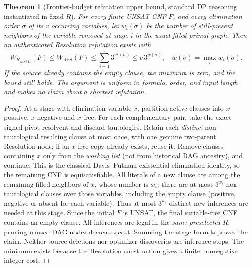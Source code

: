 \documentclass[11pt]{article}
\newtheorem{theorem}{Theorem}
\begin{document}
\begin{theorem}[Frontier-budget refutation upper bound, standard DP reasoning instantiated in fixed $R$]
For every finite UNSAT CNF $F$, and \emph{every} elimination order $\sigma$ of its $v$ occurring variables, let $w_i(\sigma)$ be the number of still-present neighbors of the variable removed at stage $i$ in the usual \emph{filled} primal graph. Then an authenticated Resolution refutation exists with
\[
\boxed{W_{R_{\mathrm{mix341}}}(F)\le W_{\mathrm{RES}}(F)\le
       \sum_{i=1}^{v}3^{w_i(\sigma)}
       \le v\,3^{w(\sigma)},\quad
       w(\sigma)=\max_i w_i(\sigma).}
\]
If the source already contains the empty clause, the minimum is zero, and the bound still holds. The argument is uniform in formula, order, and input length and makes no claim about a shortest refutation.
\end{theorem}
\begin{proof}
At a stage with elimination variable $x$, partition active clauses into $x$-positive, $x$-negative and $x$-free. For each complementary pair, take the exact signed-pivot resolvent and discard tautologies. Retain each \emph{distinct} non-tautological resulting clause at most once, with one genuine two-parent Resolution node; if an $x$-free copy already exists, reuse it. Remove clauses containing $x$ only from the \emph{working list} (not from historical DAG ancestry), and continue. This is the classical Davis--Putnam existential elimination identity, so the remaining CNF is equisatisfiable. All literals of a new clause are among the remaining filled neighbors of $x$, whose number is $w_i$; there are at most $3^{w_i}$ non-tautological clauses over those variables, including the empty clause (positive, negative or absent for each variable). Thus at most $3^{w_i}$ distinct new inferences are needed at this stage. Since the initial $F$ is UNSAT, the final variable-free CNF contains an empty clause. All inferences are legal in the \emph{same preselected} $R$; pruning unused DAG nodes decreases cost. Summing the stage bounds proves the claim. Neither source deletions nor optimizer discoveries are inference steps. The minimum exists because the Resolution construction gives a finite nonnegative integer cost.
\end{proof}
\end{document}
